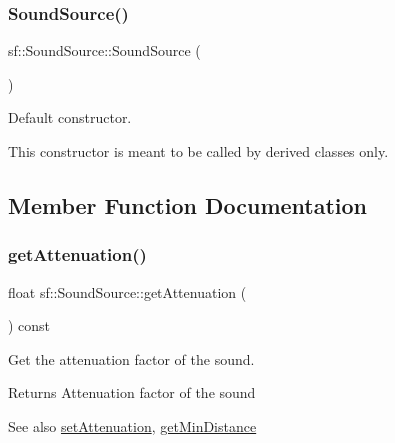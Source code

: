 \subsubsection{\texorpdfstring{SoundSource()}{SoundSource()}\hspace{0.1cm}{\footnotesize\ttfamily [2/2]}}
{\footnotesize\ttfamily sf\+::\+Sound\+Source\+::\+Sound\+Source (\begin{DoxyParamCaption}{ }\end{DoxyParamCaption})\hspace{0.3cm}{\ttfamily [protected]}}



Default constructor. 

This constructor is meant to be called by derived classes only. \begin{DoxyVerb}\end{DoxyVerb}
 

\subsection{Member Function Documentation}
\mbox{\label{classsf_1_1_sound_source_a8ad7dafb4f1b4afbc638cebe24f48cc9}} 
\subsubsection{\texorpdfstring{getAttenuation()}{getAttenuation()}}
{\footnotesize\ttfamily float sf\+::\+Sound\+Source\+::get\+Attenuation (\begin{DoxyParamCaption}{ }\end{DoxyParamCaption}) const}



Get the attenuation factor of the sound. 

\begin{DoxyReturn}{Returns}
Attenuation factor of the sound
\end{DoxyReturn}
\begin{DoxySeeAlso}{See also}
\mbox{\hyperlink{classsf_1_1_sound_source_aa2adff44cd2f8b4e3c7315d7c2a45626}{set\+Attenuation}}, \mbox{\hyperlink{classsf_1_1_sound_source_a605ca7f359ec1c36fcccdcd4696562ac}{get\+Min\+Distance}} \begin{DoxyVerb}\end{DoxyVerb}
 
\end{DoxySeeAlso}
\mbox{\label{classsf_1_1_sound_source_a605ca7f359ec1c36fcccdcd4696562ac}} 
